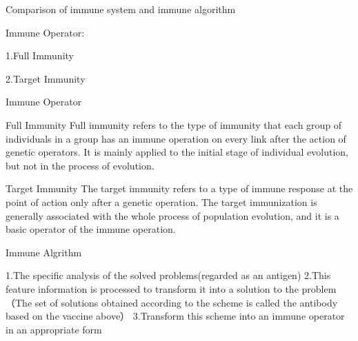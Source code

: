 \begin{frame}{Comparison of immune system and immune algorithm}
\par\setlength\parindent{9em}
Immune Operator:
 \par\setlength\parindent{11em}
 1.Full Immunity
 \par\setlength\parindent{11em}
 2.Target Immunity
    

     
 
\end{frame}


\begin{frame}{
Immune Operator}
\begin{block}{Full Immunity}
Full immunity refers to the type of immunity that each group of individuals in a group has an immune operation on every link after the action of genetic operators. It is mainly applied to the initial stage of individual evolution, but not in the process of evolution.
\end{block}
\begin{block}{Target Immunity}
The target immunity refers to a type of immune response at the point of action only after a genetic operation. The target immunization is generally associated with the whole process of population evolution, and it is a basic operator of the immune operation.
\end{block}

\end{frame}

\begin{frame}{Immune Algrithm}
 
 \indent 
 1.The specific analysis of the solved problems(regarded as an antigen)
 \newline
 2.This feature information is processed to transform it into a solution to the problem（The set of solutions obtained according to the scheme is called the antibody based on the vaccine above）
 \newline
 3.Transform this scheme into an immune operator in an appropriate form
 
\end{frame}

